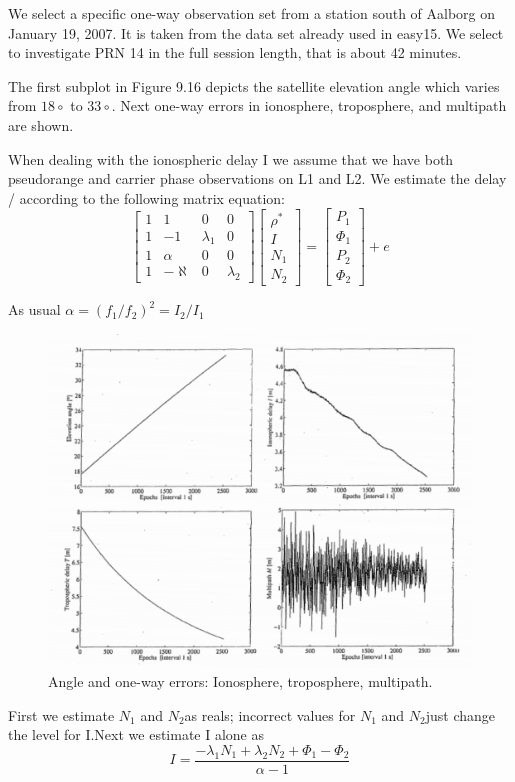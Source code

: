 		We select a specific one-way observation set from a station south of Aalborg on January 19, 2007. It is taken from the data set already used in easy15. We select to investigate PRN 14 in the full session length, that is about 42 minutes.
		
		The first subplot in Figure 9.16 depicts the satellite elevation angle which varies from $18\circ$ to $33\circ$. Next one-way errors in ionosphere, troposphere, and multipath are shown.
		
		When dealing with the ionospheric delay I we assume that we have both pseudorange and carrier phase observations on L1 and L2. We estimate the delay / according to the following matrix equation:
		\begin{equation}\label{eq:9.38}
			\begin{bmatrix}
				1 &       1 &         0 & 0 \\
				1 &      -1 & \lambda_1 & 0 \\
				1 &  \alpha & 		  0 & 0 \\
				1 & -\aleph & 		  0 & \lambda_2
			\end{bmatrix}
			\begin{bmatrix}
				\rho^* \\ I \\ N_1 \\ N_2
			\end{bmatrix}=
			\begin{bmatrix}
				P_1 \\ \Phi_1 \\ P_2 \\ \Phi_2
			\end{bmatrix}+e
		\end{equation}
		
		As usual $\alpha=(f_1/f_2)^2=I_2/I_1$
		
		\begin{figure}
			\centering
			\includegraphics[width=0.7\linewidth]{TeX_files/Part03/chapter09/image/9-16}
			\caption{Angle and one-way errors: Ionosphere, troposphere, multipath.}
			\label{fig:9-16}
		\end{figure}
		First we estimate $N_1$ and $N_2$as reals; incorrect values for $N_1$ and $N_2$just change the level for I.Next we estimate I alone as
		\begin{equation}\label{eq:9.39}
			I=\dfrac{-\lambda_1N_1+\lambda_2N_2+\Phi_1-\Phi_2}{\alpha-1}
		\end{equation}
		
